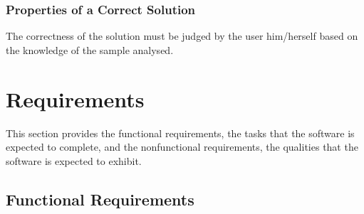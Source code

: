 \documentclass[12pt]{article}
\begin{document}
\subsubsection{Properties of a Correct Solution} \label{sec_CorrectSolution}

\noindent
The correctness of the solution must be judged by the user him/herself based on the knowledge of the sample analysed.

\section{Requirements}

This section provides the functional requirements, the tasks that the
software is expected to complete, and the nonfunctional requirements, the
qualities that the software is expected to exhibit.

\subsection{Functional Requirements}
\end{document}
